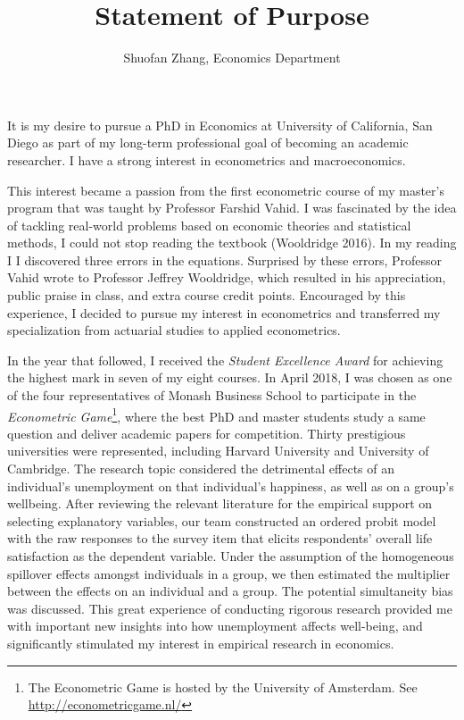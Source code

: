 \documentclass[12pt,]{article}
\title{Statement of Purpose}
\author{Shuofan Zhang, Economics Department}
\date{}
\let\rmarkdownfootnote\footnote%
\def\footnote{\protect\rmarkdownfootnote}
\begin{document}
\maketitle


It is my desire to pursue a PhD in Economics at University of
California, San Diego as part of my long-term professional goal of
becoming an academic researcher. I have a strong interest in
econometrics and macroeconomics.

This interest became a passion from the first econometric course of my
master's program that was taught by Professor Farshid Vahid. I was
fascinated by the idea of tackling real-world problems based on economic
theories and statistical methods, I could not stop reading the textbook
(Wooldridge 2016). In my reading I I discovered three errors in the
equations. Surprised by these errors, Professor Vahid wrote to Professor
Jeffrey Wooldridge, which resulted in his appreciation, public praise in
class, and extra course credit points. Encouraged by this experience, I
decided to pursue my interest in econometrics and transferred my
specialization from actuarial studies to applied econometrics.

In the year that followed, I received the \emph{Student Excellence
Award} for achieving the highest mark in seven of my eight courses. In
April 2018, I was chosen as one of the four representatives of Monash
Business School to participate in the \emph{Econometric Game}\footnote{The
  Econometric Game is hosted by the University of Amsterdam. See
  \url{http://econometricgame.nl/}}, where the best PhD and master
students study a same question and deliver academic papers for
competition. Thirty prestigious universities were represented, including
Harvard University and University of Cambridge. The research topic
considered the detrimental effects of an individual's unemployment on
that individual's happiness, as well as on a group's wellbeing. After
reviewing the relevant literature for the empirical support on selecting
explanatory variables, our team constructed an ordered probit model with
the raw responses to the survey item that elicits respondents' overall
life satisfaction as the dependent variable. Under the assumption of the
homogeneous spillover effects amongst individuals in a group, we then
estimated the multiplier between the effects on an individual and a
group. The potential simultaneity bias was discussed. This great
experience of conducting rigorous research provided me with important
new insights into how unemployment affects well-being, and significantly
stimulated my interest in empirical research in economics.
\end{document}
